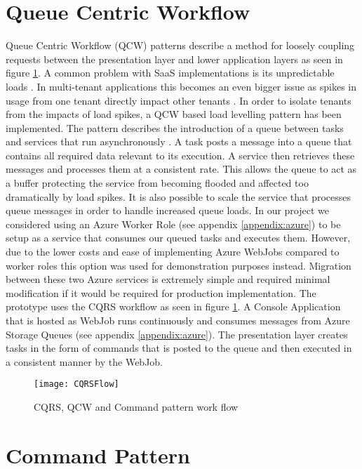 \section{Queue Centric Workflow}
\label{sec:qcw}
 Queue Centric Workflow (QCW) patterns describe a method for loosely coupling requests between the presentation layer and lower application layers as seen in figure \ref{fig:CQRSFlow}. A common problem with SaaS  implementations is its unpredictable loads \cite{Homer2014}. In multi-tenant applications this becomes an even bigger issue as spikes in usage from one tenant directly impact other tenants \cite{Betts2012-ad}. In order to isolate tenants from the impacts of load spikes, a QCW based load levelling pattern has been implemented. The pattern describes the introduction of a queue between tasks and services that run asynchronously \cite{Wilder2012-so}. A task posts a message into a queue that contains all required data relevant to its execution. A service then retrieves these messages and processes them at a consistent rate. This allows the queue to act as a buffer protecting the service from becoming flooded and affected too dramatically by load spikes.
It is also possible to scale the service that processes queue messages in order to handle increased queue loads. In our project we considered using an Azure Worker Role (see appendix \ref{appendix:azure}) to be setup as a service that consumes our queued tasks and executes them. However, due to the lower costs and ease of implementing Azure WebJobs compared to worker roles this option was used for demonstration purposes instead. Migration between these two Azure services is extremely simple and required minimal modification if it would be required for production implementation. The prototype uses the CQRS workflow as seen in figure \ref{fig:CQRSFlow}. A Console Application that is hosted as WebJob runs continuously and consumes messages from Azure Storage Queues (see appendix \ref{appendix:azure}). The presentation layer creates tasks in the form of commands that is posted to the queue and then executed in a consistent manner by the WebJob.
 
\begin{figure}
\centering
\texttt{[image: CQRSFlow]}
\caption{CQRS, QCW and Command pattern work flow}
\label{fig:CQRSFlow}
\end{figure}
 
 
 \section{Command Pattern}
 
